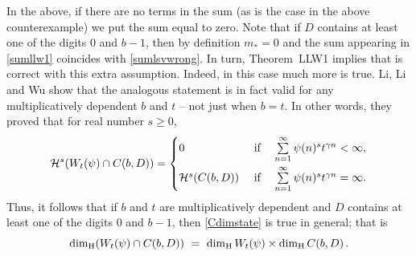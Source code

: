 \documentclass[12pt]{article}
\theoremstyle{definition}
\theoremstyle{remark}
\begin{document}
\noindent In the above, if there are no terms in the sum (as is the case in the above counterexample)  we put the sum equal to zero.   Note that if $D$ contains at least one of the digits  $0$ and $b-1$, then by definition  $m_{*}=0$  and the sum appearing in \eqref{sumllw1} coincides with  \eqref{sumlsvwrong}.  In turn, Theorem~LLW1 implies that \cite[Theorem~4]{LSV2007} is correct with this extra assumption. Indeed, in this case much more is true.  Li, Li and Wu \cite[Theorem 1.5]{LLW2025}  show that the analogous statement is in fact  valid for any  multiplicatively dependent $b$ and $t$ -- not just when $b=t$.  %
In other words, they proved that for real number $s\geq0$,
\begin{equation}  \label{llwbt}
\mathcal{H}^{s}(W_{t}(\psi)\cap C(b,D))=\begin{cases} 0  \ &{\rm if}\quad \sum\limits_{n=1}^{\infty}\psi(n)^{s}t^{\gamma n}<\infty, \\[2ex]
\mathcal{H}^{s}(C(b,D))   \ &{\rm if}\quad  \sum\limits_{n=1}^{\infty}\psi(n)^{s}t^{\gamma n}=\infty. \end{cases}
\end{equation}
Thus, it follows that if $b$ and $t$ are multiplicatively dependent and $D$ contains at least one of the digits $0$ and $b-1$, then \eqref{Cdimstate} is  true in general; that is
  \begin{equation}  \label{dimstate}
\dim_{\rm H}(W_{t}(\psi)\cap C(b,D))  \  =  \  \dim_{\rm H}W_{t}(\psi)   \times \dim_{\rm H}C(b,D)  \, .
\end{equation}

\bigskip
\end{document}
